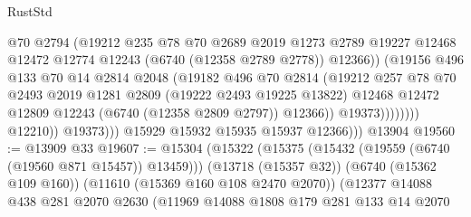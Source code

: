 \begin{lexlean}{RustStd}
\begin{coremodule}
                                    @70
                                    @2794
                                    (@19212
                                      @235
                                      @78
                                      @70
                                      @2689
                                      @2019
                                      @1273
                                      @2789
                                      @19227
                                      @12468
                                      @12472
                                      @12774
                                      @12243
                                      (@6740 (@12358 @2789 @2778))
                                      @12366))
                                  (@19156
                                    @496
                                    @133
                                    @70
                                    @14
                                    @2814
                                    @2048
                                    (@19182
                                      @496
                                      @70
                                      @2814
                                      (@19212
                                        @257
                                        @78
                                        @70
                                        @2493
                                        @2019
                                        @1281
                                        @2809
                                        (@19222 @2493 @19225 @13822)
                                        @12468
                                        @12472
                                        @12809
                                        @12243
                                        (@6740 (@12358 @2809 @2797))
                                        @12366))
                                    @19373))))))))
                    @12210))
                @19373)))
          @15929
          @15932
          @15935
          @15937
          @12366)))
    @13904
@19560 := @13909 @33
@19607 := @15304
    (@15322
      (@15375 (@15432 (@19559 (@6740 (@19560 @871 @15457)) @13459)))
      (@13718 (@15357 @32))
      (@6740 (@15362 @109 @160))
      (@11610 (@15369 @160 @108 @2470 @2070))
      (@12377
        @14088
        @438
        @281
        @2070
        @2630
        (@11969
          @14088
          @1808
          @179
          @281
          @133
          @14
          @2070

\end{coremodule}
\end{lexlean}
